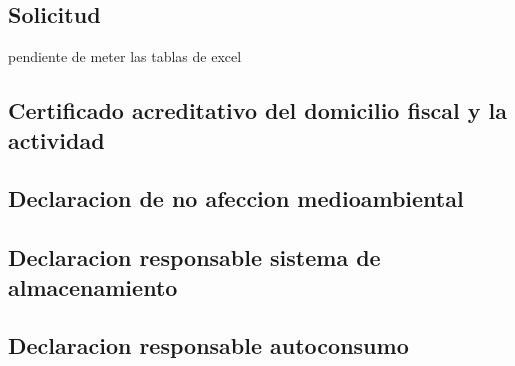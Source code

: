 \documentclass{article}
\begin{document}
\subsection{Solicitud}
pendiente de meter las tablas de excel

\subsection{Certificado acreditativo del domicilio fiscal y la actividad}

\subsection{Declaracion de no afeccion medioambiental}


\subsection{Declaracion responsable sistema de almacenamiento}


\subsection{Declaracion responsable autoconsumo}

\end{document}
